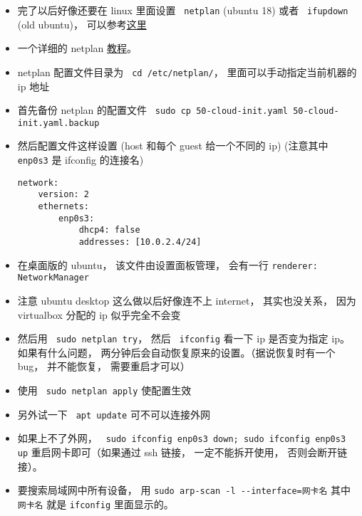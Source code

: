 \begin{itemize}
\item 完了以后好像还要在 linux 里面设置 \verb` netplan` (ubuntu 18) 或者 \verb` ifupdown` (old ubuntu)， 可以参考\href{https://www.linux.com/tutorials/how-use-netplan-network-configuration-tool-linux/}{这里}
\item 一个详细的 netplan \href{https://linuxconfig.org/netplan-network-configuration-tutorial-for-beginners}{教程}。
\item netplan 配置文件目录为 \verb` cd /etc/netplan/`， 里面可以手动指定当前机器的 ip 地址
\item 首先备份 netplan 的配置文件 \verb` sudo cp 50-cloud-init.yaml 50-cloud-init.yaml.backup`
\item 然后配置文件这样设置 (host 和每个 guest 给一个不同的 ip) (注意其中 \verb` enp0s3` 是 ifconfig 的连接名)
\begin{lstlisting}[language=none]
network:
    version: 2
    ethernets:
        enp0s3:
            dhcp4: false
            addresses: [10.0.2.4/24]
\end{lstlisting}
\item 在桌面版的 ubuntu， 该文件由设置面板管理， 会有一行 \verb|renderer: NetworkManager|
\item 注意 ubuntu desktop 这么做以后好像连不上 internet， 其实也没关系， 因为 virtualbox 分配的 ip 似乎完全不会变
\item 然后用 \verb` sudo netplan try`， 然后 \verb` ifconfig` 看一下 ip 是否变为指定 ip。 如果有什么问题， 两分钟后会自动恢复原来的设置。（据说恢复时有一个 bug， 并不能恢复， 需要重启才可以）
\item 使用 \verb` sudo netplan apply` 使配置生效
\item 另外试一下 \verb` apt update` 可不可以连接外网
\item 如果上不了外网， \verb` sudo ifconfig enp0s3 down; sudo ifconfig enp0s3 up` 重启网卡即可（如果通过 ssh 链接， 一定不能拆开使用， 否则会断开链接）。
\item 要搜索局域网中所有设备， 用 \verb|sudo arp-scan -l --interface=网卡名| 其中 \verb|网卡名| 就是 \verb|ifconfig| 里面显示的。
\end{itemize}


